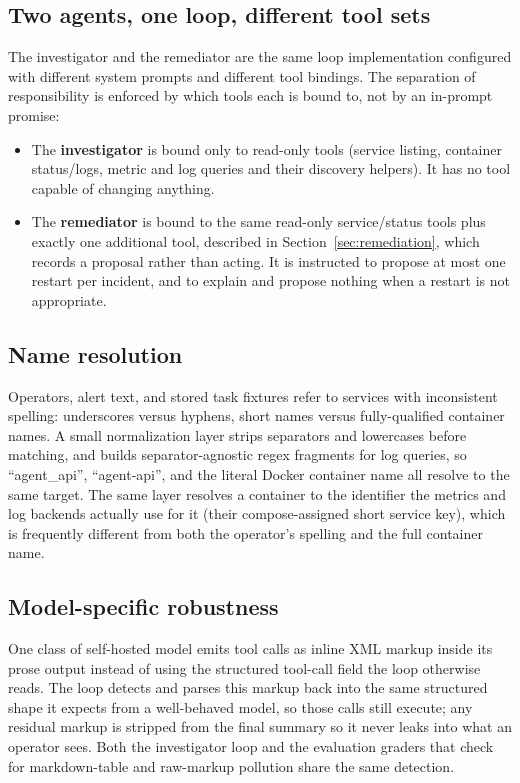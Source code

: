 \documentclass[11pt]{article}
\begin{document}
\subsection{Two agents, one loop, different tool sets}

The investigator and the remediator are the same loop implementation
configured with different system prompts and different tool bindings. The
separation of responsibility is enforced by which tools each is bound to,
not by an in-prompt promise:

\begin{itemize}
  \item The \textbf{investigator} is bound only to read-only tools (service
    listing, container status/logs, metric and log queries and their
    discovery helpers). It has no tool capable of changing anything.
  \item The \textbf{remediator} is bound to the same read-only service/status
    tools plus exactly one additional tool, described in
    Section~\ref{sec:remediation}, which records a proposal rather than
    acting. It is instructed to propose at most one restart per incident,
    and to explain and propose nothing when a restart is not appropriate.
\end{itemize}

\subsection{Name resolution}

Operators, alert text, and stored task fixtures refer to services with
inconsistent spelling: underscores versus hyphens, short names versus
fully-qualified container names. A small normalization layer strips
separators and lowercases before matching, and builds separator-agnostic
regex fragments for log queries, so ``agent\_api'', ``agent-api'', and the
literal Docker container name all resolve to the same target. The same
layer resolves a container to the identifier the metrics and log backends
actually use for it (their compose-assigned short service key), which is
frequently different from both the operator's spelling and the full
container name.

\subsection{Model-specific robustness}

One class of self-hosted model emits tool calls as inline XML markup inside
its prose output instead of using the structured tool-call field the loop
otherwise reads. The loop detects and parses this markup back into the same
structured shape it expects from a well-behaved model, so those calls still
execute; any residual markup is stripped from the final summary so it never
leaks into what an operator sees. Both the investigator loop and the
evaluation graders that check for markdown-table and raw-markup pollution
share the same detection.
\end{document}
